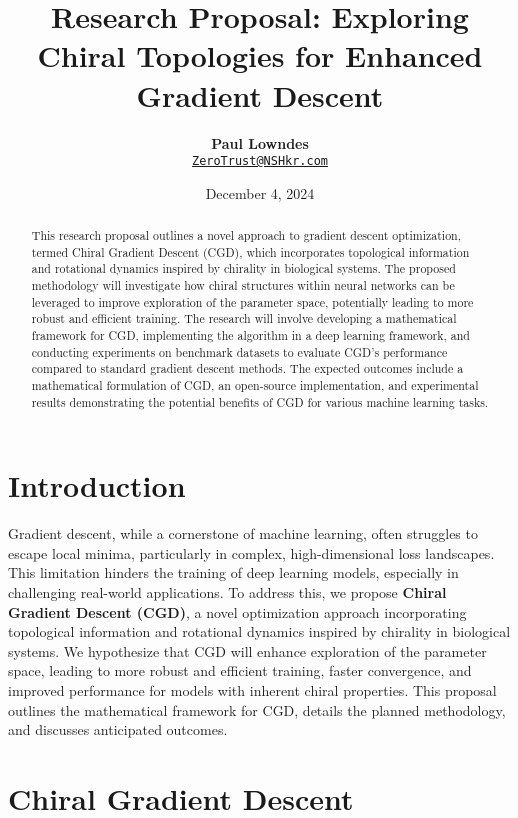 \documentclass[12pt, a4paper]{article}
\title{\vspace{-2cm}\textbf{Research Proposal: Exploring Chiral Topologies for Enhanced Gradient Descent}}
\author{\textbf{Paul Lowndes} \\ \href{mailto:ZeroTrust@NSHkr.com}{\texttt{ZeroTrust@NSHkr.com}}}
\date{\small December 4, 2024}
\begin{document}
\maketitle
\vspace{-1.5em} 

\begin{abstract}
This research proposal outlines a novel approach to gradient descent optimization, termed Chiral Gradient Descent (CGD), which incorporates topological information and rotational dynamics inspired by chirality in biological systems. The proposed methodology will investigate how chiral structures within neural networks can be leveraged to improve exploration of the parameter space, potentially leading to more robust and efficient training. The research will involve developing a mathematical framework for CGD, implementing the algorithm in a deep learning framework, and conducting experiments on benchmark datasets to evaluate CGD's performance compared to standard gradient descent methods. The expected outcomes include a mathematical formulation of CGD, an open-source implementation, and experimental results demonstrating the potential benefits of CGD for various machine learning tasks.
\end{abstract}

\section{Introduction}

Gradient descent, while a cornerstone of machine learning, often struggles to escape local minima, particularly in complex, high-dimensional loss landscapes. This limitation hinders the training of deep learning models, especially in challenging real-world applications.  To address this, we propose \textbf{Chiral Gradient Descent (CGD)}, a novel optimization approach incorporating topological information and rotational dynamics inspired by chirality in biological systems.  We hypothesize that CGD will enhance exploration of the parameter space, leading to more robust and efficient training, faster convergence, and improved performance for models with inherent chiral properties. This proposal outlines the mathematical framework for CGD, details the planned methodology, and discusses anticipated outcomes.

\section{Chiral Gradient Descent}
\end{document}
